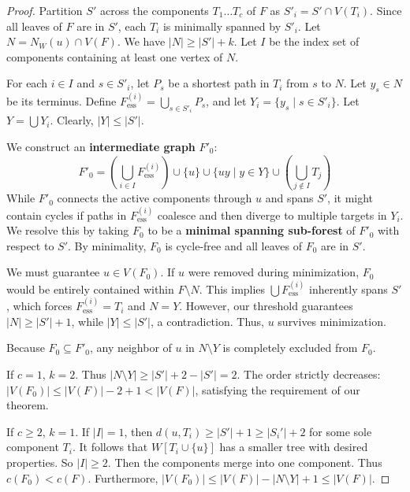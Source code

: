 \documentclass[10pt,a4paper]{amsart}
\begin{document}
\begin{proof}
Partition $S'$ across the components $T_1 \dots T_c$ of $F$ as $S'_i = S' \cap V(T_i)$. Since all leaves of $F$ are in $S'$, each $T_i$ is minimally spanned by $S'_i$. 
Let $N = N_W(u) \cap V(F)$. We have $|N| \ge |S'| + k$. Let $I$ be the index set of components containing at least one vertex of $N$. 

For each $i \in I$ and $s \in S'_i$, let $P_s$ be a shortest path in $T_i$ from $s$ to $N$. Let $y_s \in N$ be its terminus. Define $F_{\text{ess}}^{(i)} = \bigcup_{s \in S'_i} P_s$, and let $Y_i = \{y_s \mid s \in S'_i\}$. Let $Y = \bigcup Y_i$. Clearly, $|Y| \le |S'|$.

We construct an \textbf{intermediate graph} $F'_0$:
\[
F'_0 = \left( \bigcup_{i \in I} F_{\text{ess}}^{(i)} \right) \cup \{u\} \cup \{uy \mid y \in Y\} \cup \left( \bigcup_{j \notin I} T_j \right)
\]
While $F'_0$ connects the active components through $u$ and spans $S'$, it might contain cycles if paths in $F_{\text{ess}}^{(i)}$ coalesce and then diverge to multiple targets in $Y_i$. We resolve this by taking $F_0$ to be a \textbf{minimal spanning sub-forest} of $F'_0$ with respect to $S'$. By minimality, $F_0$ is cycle-free and all leaves of $F_0$ are in $S'$. 

We must guarantee $u \in V(F_0)$. If $u$ were removed during minimization, $F_0$ would be entirely contained within $F \setminus N$. This implies $\bigcup F_{\text{ess}}^{(i)}$ inherently spans $S'$, which forces $F_{\text{ess}}^{(i)} = T_i$ and $N = Y$. However, our threshold guarantees $|N| \ge |S'| + 1$, while $|Y| \le |S'|$, a contradiction. Thus, $u$ survives minimization.

Because $F_0 \subseteq F'_0$, any neighbor of $u$ in $N \setminus Y$ is completely excluded from $F_0$.

If $c = 1$, $k=2$. Thus $|N \setminus Y| \ge |S'|+2 - |S'| = 2$. The order strictly decreases: $|V(F_0)| \le |V(F)| - 2 + 1 < |V(F)|$, satisfying the requirement of our theorem. 

If $c \ge 2$, $k=1$. If $|I|=1$, then $d(u, T_i)\ge |S'|+1\ge |S_i'|+2$ for some sole component $T_i$. It follows that $W[T_i\cup \{u\}]$ has a smaller tree with desired properties. So $|I| \ge 2$.  Then the components merge into one component.  Thus $c(F_0) < c(F)$. Furthermore, $|V(F_0)| \le |V(F)| - |N \setminus Y| + 1 \le |V(F)|$.
\end{proof}
\end{document}

